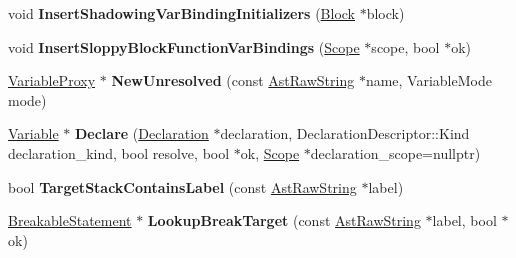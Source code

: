 \begin{DoxyCompactItemize}
\item 
void {\bfseries Insert\+Shadowing\+Var\+Binding\+Initializers} (\hyperlink{classv8_1_1internal_1_1_block}{Block} $\ast$block)\hypertarget{classv8_1_1internal_1_1_parser_a55aec54903a1d92ce2e578c21fb88fe6}{}\label{classv8_1_1internal_1_1_parser_a55aec54903a1d92ce2e578c21fb88fe6}

\item 
void {\bfseries Insert\+Sloppy\+Block\+Function\+Var\+Bindings} (\hyperlink{classv8_1_1internal_1_1_scope}{Scope} $\ast$scope, bool $\ast$ok)\hypertarget{classv8_1_1internal_1_1_parser_a1e4d5e4b4f8c89f9ac03f0d60fc85b29}{}\label{classv8_1_1internal_1_1_parser_a1e4d5e4b4f8c89f9ac03f0d60fc85b29}

\item 
\hyperlink{classv8_1_1internal_1_1_variable_proxy}{Variable\+Proxy} $\ast$ {\bfseries New\+Unresolved} (const \hyperlink{classv8_1_1internal_1_1_ast_raw_string}{Ast\+Raw\+String} $\ast$name, Variable\+Mode mode)\hypertarget{classv8_1_1internal_1_1_parser_a0eb9fec80739a999e0b0f6e60975c2a3}{}\label{classv8_1_1internal_1_1_parser_a0eb9fec80739a999e0b0f6e60975c2a3}

\item 
\hyperlink{classv8_1_1internal_1_1_variable}{Variable} $\ast$ {\bfseries Declare} (\hyperlink{classv8_1_1internal_1_1_declaration}{Declaration} $\ast$declaration, Declaration\+Descriptor\+::\+Kind declaration\+\_\+kind, bool resolve, bool $\ast$ok, \hyperlink{classv8_1_1internal_1_1_scope}{Scope} $\ast$declaration\+\_\+scope=nullptr)\hypertarget{classv8_1_1internal_1_1_parser_a766bcef294975a79177c2d49b7256a1b}{}\label{classv8_1_1internal_1_1_parser_a766bcef294975a79177c2d49b7256a1b}

\item 
bool {\bfseries Target\+Stack\+Contains\+Label} (const \hyperlink{classv8_1_1internal_1_1_ast_raw_string}{Ast\+Raw\+String} $\ast$label)\hypertarget{classv8_1_1internal_1_1_parser_a1c6cc59aca8b9458772347ee83e924e3}{}\label{classv8_1_1internal_1_1_parser_a1c6cc59aca8b9458772347ee83e924e3}

\item 
\hyperlink{classv8_1_1internal_1_1_breakable_statement}{Breakable\+Statement} $\ast$ {\bfseries Lookup\+Break\+Target} (const \hyperlink{classv8_1_1internal_1_1_ast_raw_string}{Ast\+Raw\+String} $\ast$label, bool $\ast$ok)\hypertarget{classv8_1_1internal_1_1_parser_a5d8f68d8f8909a243b471924569cd96f}{}\label{classv8_1_1internal_1_1_parser_a5d8f68d8f8909a243b471924569cd96f}


\end{DoxyCompactItemize}
